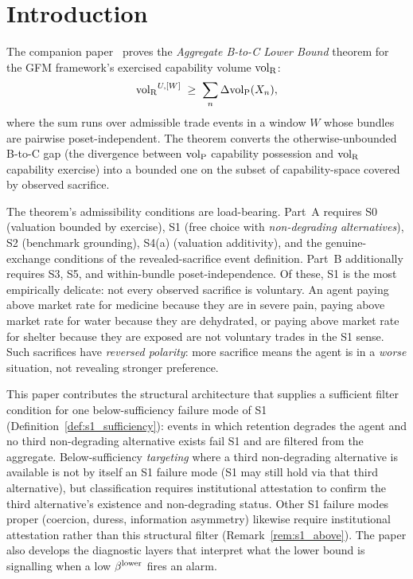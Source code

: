 \section{Introduction}
\label{sec:introduction}

The companion paper~\citep[Revealed~Sacrifice]{lasser2026paper8a} proves the
\emph{Aggregate B-to-C Lower Bound} theorem for the GFM framework's exercised
capability volume ${\operatorname{vol}_{\mathrm{R}}}$:
\[
  {\operatorname{vol}_{\mathrm{R}}}^{U,[W]} \;\geq\; \sum_n \Delta{\operatorname{vol}_{\mathrm{P}}}(X_n),
\]
where the sum runs over admissible trade events in a window $W$ whose bundles
are pairwise poset-independent.  The theorem converts the otherwise-unbounded
B-to-C gap (the divergence between ${\operatorname{vol}_{\mathrm{P}}}$ capability possession and ${\operatorname{vol}_{\mathrm{R}}}$
capability exercise) into a bounded one on the subset of capability-space
covered by observed sacrifice.

The theorem's admissibility conditions are load-bearing. Part~A requires S0
(valuation bounded by exercise), S1 (free choice with \emph{non-degrading
alternatives}), S2 (benchmark grounding), S4(a) (valuation additivity), and the
genuine-exchange conditions of the revealed-sacrifice event definition.  Part~B
additionally requires S3, S5, and within-bundle poset-independence.  Of these,
S1 is the most empirically delicate: not every observed sacrifice is voluntary.
An agent paying above market rate for medicine because they are in severe pain,
paying above market rate for water because they are dehydrated, or paying above
market rate for shelter because they are exposed are not voluntary trades in
the S1 sense.  Such sacrifices have \emph{reversed polarity}: more sacrifice
means the agent is in a \emph{worse} situation, not revealing stronger
preference.

This paper contributes the structural architecture that supplies a sufficient
filter condition for one below-sufficiency failure mode of S1
(Definition~\ref{def:s1_sufficiency}): events in which retention degrades the
agent and no third non-degrading alternative exists fail S1 and are filtered
from the aggregate.  Below-sufficiency \emph{targeting} where a third
non-degrading alternative is available is not by itself an S1 failure mode
(S1 may still hold via that third alternative), but classification requires
institutional attestation to confirm the third alternative's existence and
non-degrading status.  Other S1 failure modes proper (coercion, duress,
information asymmetry) likewise require institutional attestation rather
than this structural filter
(Remark~\ref{rem:s1_above}).  The paper also develops the diagnostic layers
that interpret what the lower bound is signalling when a low $\beta^{\mathrm{lower}}$ fires an
alarm.

